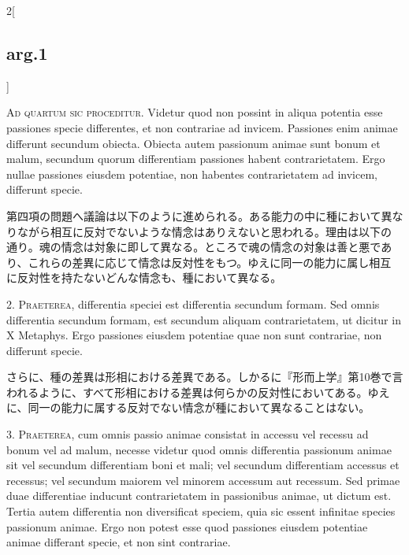 \documentclass[paper=a4paper,fontsize=10pt,jafontsize=9pt,titlepage]{jlreq}
\begin{document}
\begin{paracol}{2}[\subsection{arg.1}]

{\scshape Ad quartum sic proceditur}. Videtur quod non possint in aliqua potentia
esse passiones specie differentes, et non contrariae ad
invicem. Passiones enim animae differunt secundum obiecta. Obiecta autem
passionum animae sunt bonum et malum, secundum quorum differentiam
passiones habent contrarietatem. Ergo nullae passiones eiusdem
potentiae, non habentes contrarietatem ad invicem, differunt specie.

\switchcolumn

第四項の問題へ議論は以下のように進められる。ある能力の中に種において異な
 りながら相互に反対でないような情念はありえないと思われる。理由は以下の
 通り。魂の情念は対象に即して異なる。ところで魂の情念の対象は善と悪であ
 り、これらの差異に応じて情念は反対性をもつ。ゆえに同一の能力に属し相互
 に反対性を持たないどんな情念も、種において異なる。


2. {\scshape Praeterea}, differentia speciei est differentia secundum formam. Sed
omnis differentia secundum formam, est secundum aliquam contrarietatem,
ut dicitur in X Metaphys. Ergo passiones eiusdem potentiae quae non sunt
contrariae, non differunt specie.

\switchcolumn

さらに、種の差異は形相における差異である。しかるに『形而上学』第10巻で言
 われるように、すべて形相における差異は何らかの反対性においてある。ゆえ
 に、同一の能力に属する反対でない情念が種において異なることはない。


3. {\scshape Praeterea}, cum omnis passio animae consistat in accessu vel recessu ad
bonum vel ad malum, necesse videtur quod omnis differentia passionum
animae sit vel secundum differentiam boni et mali; vel secundum
differentiam accessus et recessus; vel secundum maiorem vel minorem
accessum aut recessum. Sed primae duae differentiae inducunt
contrarietatem in passionibus animae, ut dictum est. Tertia autem
differentia non diversificat speciem, quia sic essent infinitae species
passionum animae. Ergo non potest esse quod passiones eiusdem potentiae
animae differant specie, et non sint contrariae.


\end{paracol}
\end{document}
